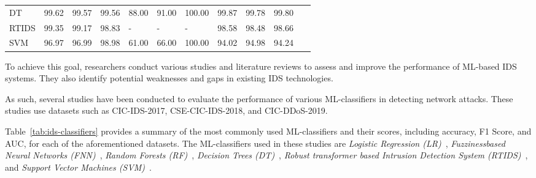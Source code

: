 \begin{table*}
{\begin{tabular}{@{}r|lll|lll|lll|r@{}}
            \multicolumn{1}{|l|}{DT}                   & 99.62                                      & 99.57                                          & 99.56                                       & 88.00             & 91.00             & 100.00       & 99.87             & 99.78             & 99.80        & \multicolumn{1}{l|}{~\cite{pujari2022comparative, cic2019models, huang2020igan, maseer2021benchmarking}}                                                                             \\
            \multicolumn{1}{|l|}{RTIDS}                & 99.35                                      & 99.17                                          & 98.83                                       & -                 & -                 & -            & 98.58             & 98.48             & 98.66        & \multicolumn{1}{l|}{~\cite{wu2022rtids}}                                                                             \\
            \multicolumn{1}{|l|}{SVM}                  & 96.97                                      & 96.99                                          & 98.98                                       & 61.00             & 66.00             & 100.00       & 94.02             & 94.98             & 94.24        & \multicolumn{1}{l|}{~\cite{pujari2022comparative, huang2020igan, maseer2021benchmarking, faker2019, wu2022rtids} }                                                                             \\ \bottomrule
        \end{tabular}
    }
    \caption{Performance of the \textit{IDSs} classifiers on the selected datasets.}
    \label{tab:ids-classifiers}
\end{table*}

To achieve this goal, researchers conduct various studies and literature reviews to assess and improve the performance
of ML-based IDS systems.
They also identify potential weaknesses and gaps in existing IDS technologies.

As such, several studies have been conducted to evaluate the performance of various ML-classifiers in detecting network
attacks.
These studies use datasets such as CIC-IDS-2017, CSE-CIC-IDS-2018, and CIC-DDoS-2019.

Table~\ref{tab:ids-classifiers} provides a summary of the most commonly used ML-classifiers and
their scores, including accuracy, F1 Score, and AUC, for each of the aforementioned datasets.
The ML-classifiers used in these studies are \textit{Logistic Regression (LR)}~\cite{wright1995logistic},
\textit{Fuzziness\-based Neural Networks (FNN)}~\cite{ashfaq2017fuzziness}, \textit{Random Forests (RF)}~\cite{cutler2012random},
\textit{Decision Trees (DT)}~\cite{rokach2005decision}, \textit{Robust transformer based Intrusion Detection System (RTIDS)}~\cite{wu2022rtids},
and \textit{Support Vector Machines (SVM)}~\cite{suthaharan2016support}.

